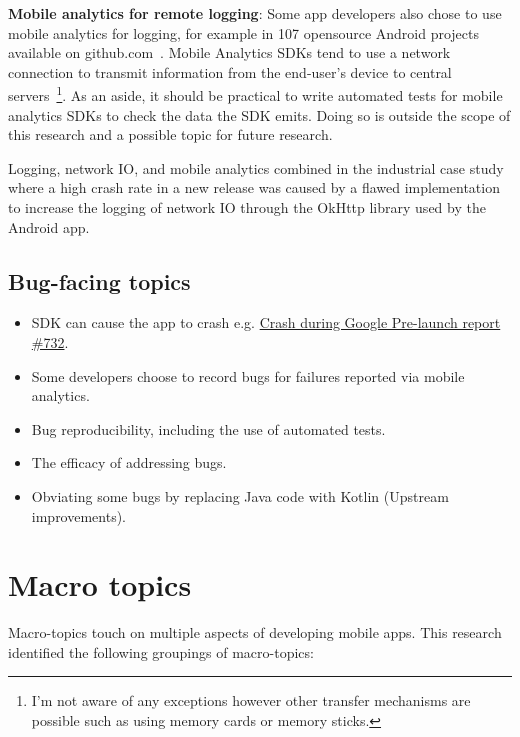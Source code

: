 \textbf{Mobile analytics for remote logging}: 
Some app developers also chose to use mobile analytics for logging, for example in 107 opensource Android projects available on github.com~\citep{harty2021_logging_practices_with_mobile_analytics}. Mobile Analytics SDKs tend to use a network connection to transmit information from the end-user's device to central servers~\footnote{I'm not aware of any exceptions however other transfer mechanisms are possible such as using memory cards or memory sticks.}. As an aside, it should be practical to write automated tests for mobile analytics SDKs to check the data the SDK emits. Doing so is outside the scope of this research and a possible topic for future research. %

Logging, network IO, and mobile analytics combined in the industrial case study where a high crash rate in a new release was caused by a flawed implementation to increase the logging of network IO through the OkHttp library used by the Android app. 

\subsection{Bug-facing topics}

\begin{itemize}
    \itemsep0em 
    \item SDK can cause the app to crash e.g. \href{https://github.com/segmentio/analytics-android/issues/732}{Crash during Google Pre-launch report \#732}.
    \item Some developers choose to record bugs for failures reported via mobile analytics.
    \item Bug reproducibility, including the use of automated tests.
    \item The efficacy of addressing bugs.
    \item Obviating some bugs by replacing Java code with Kotlin (Upstream improvements).
\end{itemize}


\section{Macro topics}
Macro-topics touch on multiple aspects of developing mobile apps. This research identified the following groupings of macro-topics:

